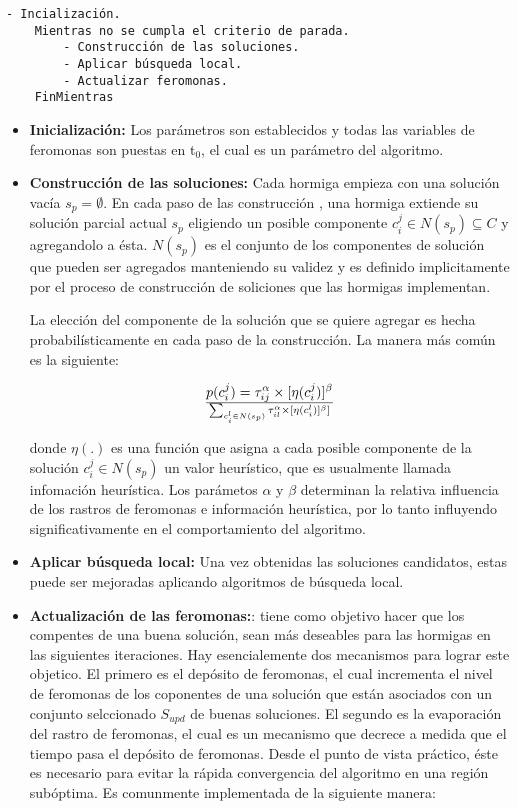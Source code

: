 \begin{lstlisting}[float=h, caption=Algoritmo General Hormiga]
    - Incialización.
    Mientras no se cumpla el criterio de parada.
        - Construcción de las soluciones.
        - Aplicar búsqueda local.
        - Actualizar feromonas.
    FinMientras
\end{lstlisting}

\begin{itemize}

\item {\bf Inicializaci\'on:} Los par\'ametros son establecidos y todas las variables 
de feromonas son puestas en t$_{0}$, el cual es un par\'ametro del algoritmo.

\item {\bf Construcci\'on de las soluciones:} Cada hormiga empieza con una soluci\'on vac\'ia
$s_p = \emptyset $. En cada paso de las construcci\'on , una hormiga
extiende su soluci\'on parcial actual $s_p$ eligiendo un posible componente $c_i^j \in N(s_p) \subseteq C$ 
y agregandolo a \'esta. $N(s_p)$ es el conjunto de los
componentes de soluci\'on que pueden ser agregados manteniendo su validez
y es definido implicitamente por el proceso de construcci\'on de soliciones
que las hormigas implementan. 

La elecci\'on del componente de la soluci\'on que se quiere agregar es 
hecha probabil\'isticamente en cada paso de la construcci\'on. La manera m\'as
com\'un es la siguiente:

\[
p(c_i^j) = {\tau_{ij}^{\alpha}  \times [ \eta (c_i^j) ]^{\beta}}  \over { \sum_{c_i^l \in N(s_p)} \tau_{il}^{\alpha} \times [\eta (c_i^l)]^{\beta}] } 
\]

donde $\eta(.)$ es una funci\'on  que asigna a cada posible componente 
de la soluci\'on $c_i^j \in N(s_p)$ un valor heur\'istico, que es usualmente
llamada infomaci\'on heur\'istica. Los par\'ametos $\alpha$ y $\beta$ 
determinan la relativa influencia de los rastros de feromonas e informaci\'on
heur\'istica, por lo tanto influyendo significativamente en el comportamiento
del algoritmo.


\item {\bf Aplicar b\'usqueda local:} Una vez obtenidas las soluciones candidatos,
estas puede ser mejoradas aplicando algoritmos de b\'usqueda local.

\item {\bf Actualizaci\'on de las feromonas:}: tiene como objetivo
hacer que los compentes de una buena soluci\'on, 
sean m\'as deseables para las hormigas en las siguientes iteraciones. Hay esencialemente
dos mecanismos para lograr este objetico. El primero es el dep\'osito de feromonas,
el cual incrementa el nivel de feromonas de los coponentes de una soluci\'on
que est\'an asociados con un conjunto selccionado $S_{upd}$ de buenas soluciones.
El segundo es la evaporaci\'on del rastro de feromonas, el cual es un mecanismo
que decrece a medida que el tiempo pasa el dep\'osito de feromonas. Desde el punto de
vista pr\'actico, \'este es necesario para evitar la r\'apida convergencia del algoritmo
en una regi\'on sub\'optima. Es comunmente implementada de la siguiente
manera:


\end{itemize}
